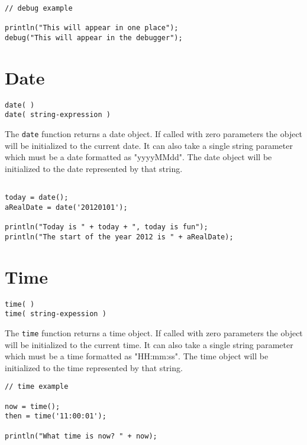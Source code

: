 \begin{lstlisting}[caption={Debug example}]
// debug example

println("This will appear in one place");
debug("This will appear in the debugger");

\end{lstlisting}

\section{Date}

\begin{Verbatim}
date( )
date( string-expression )
\end{Verbatim}

The \Verb+date+ function returns a date object. If called with zero parameters the object will be initialized to the current date. It can also take a single string parameter which must be a date formatted as "yyyyMMdd". The date object will be initialized to the date represented by that string.

\begin{lstlisting}[caption={Date example}]

today = date();
aRealDate = date('20120101');

println("Today is " + today + ", today is fun");
println("The start of the year 2012 is " + aRealDate);

\end{lstlisting}

\section{Time}

\begin{Verbatim}
time( )
time( string-expession )
\end{Verbatim}

The \Verb+time+ function returns a time object. If called with zero parameters the object will be initialized to the current time. It can also take a single string parameter which must be a time formatted as "HH:mm:ss". The time object will be initialized to the time represented by that string.

\begin{lstlisting}[caption={Time example}]
// time example

now = time();
then = time('11:00:01');

println("What time is now? " + now);

\end{lstlisting}

